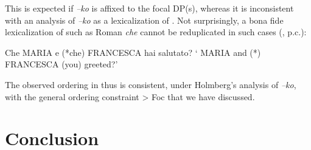 \documentclass[output=paper]{LSP/langsci}
\begin{document}
This is expected if \textit{–ko} is affixed to the focal DP(s), whereas it is inconsistent with an analysis of  \textit{–ko} as a lexicalization of . Not surprisingly, a bona fide lexicalization of  such as Roman \textit{che }cannot be reduplicated in such cases (\citeauthor{Belletti2004}, p.c.):

\ea%
    \label{ex:19}
 Che MARIA e (*che)  FRANCESCA hai salutato?
\glt       ‘   MARIA and (*) FRANCESCA (you)  greeted?’ 
\z

The observed ordering in  thus is consistent, under Holmberg's analysis of \textit{–ko}, with the general ordering constraint  > Foc that we have discussed.

\section{Conclusion}
\end{document}
